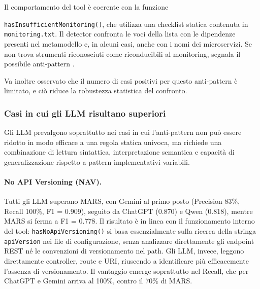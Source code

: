 Il comportamento del tool è coerente con la funzione 

\texttt{hasInsufficientMonitoring()}, che utilizza una checklist statica contenuta in \texttt{monitoring.txt}. Il detector confronta le voci della lista con le dipendenze presenti nel metamodello e, in alcuni casi, anche con i nomi dei microservizi. Se non trova strumenti riconosciuti come riconducibili al monitoring, segnala il possibile anti-pattern \cite{MARS, madern2024_mars}.

Va inoltre osservato che il numero di casi positivi per questo anti-pattern è limitato, e ciò riduce la robustezza statistica del confronto.

\subsubsection*{Casi in cui gli LLM risultano superiori}

Gli LLM prevalgono soprattutto nei casi in cui l’anti-pattern non può essere ridotto in modo efficace a una regola statica univoca, ma richiede una combinazione di lettura sintattica, interpretazione semantica e capacità di generalizzazione rispetto a pattern implementativi variabili.

\paragraph{No API Versioning (NAV).}
Tutti gli LLM superano MARS, con Gemini al primo posto (Precision 83\%, Recall 100\%, F1 = 0.909), seguito da ChatGPT (0.870) e Qwen (0.818), mentre MARS si ferma a F1 = 0.778. Il risultato è in linea con il funzionamento interno del tool: \texttt{hasNoApiVersioning()} si basa essenzialmente sulla ricerca della stringa \texttt{apiVersion} nei file di configurazione, senza analizzare direttamente gli endpoint REST né le convenzioni di versionamento nel path. Gli LLM, invece, leggono direttamente controller, route e URI, riuscendo a identificare più efficacemente l’assenza di versionamento. Il vantaggio emerge soprattutto nel Recall, che per ChatGPT e Gemini arriva al 100\%, contro il 70\% di MARS.

